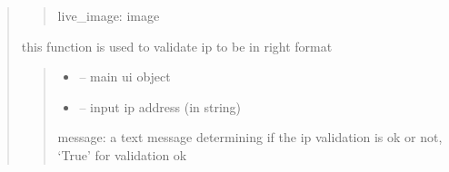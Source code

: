 \documentclass[letterpaper,10pt,english]{sphinxmanual}
\begin{document}
\begin{quote}
\begin{savenotes}
\begin{fulllineitems}
\begin{quote}
\begin{description}
\sphinxAtStartPar
live\_image: image

\end{description}\end{quote}

\end{fulllineitems}\end{savenotes}


\begin{savenotes}\begin{fulllineitems}
\label{\detokenize{setting/backend/camera_funcs:oxin.backend.camera_funcs.ip_validation}}
\pysigstartsignatures
{}
\pysigstopsignatures
\sphinxAtStartPar
this function is used to validate ip to be in right format
\begin{quote}\begin{description}
\begin{itemize}
\item {} 
\sphinxAtStartPar
{} – main ui object

\item {} 
\sphinxAtStartPar
{} – input ip address (in string)

\end{itemize}

\sphinxAtStartPar
message: a text message determining if the ip validation is ok or not,
‘True’ for validation ok

\end{description}\end{quote}

\end{fulllineitems}\end{savenotes}



\end{quote}
\end{document}
